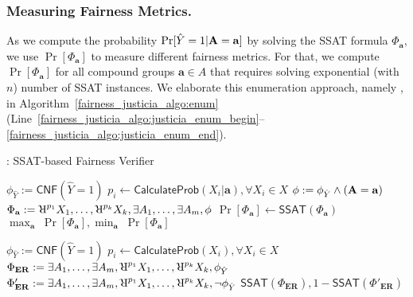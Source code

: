 \subsubsection{Measuring Fairness Metrics.}
As we compute the probability $\Pr[\hat{Y} = 1 | \mathbf{A} = \mathbf{a}]$ by solving the SSAT formula $ \Phi_\mathbf{a} $, we  use $ \Pr[\Phi_\mathbf{a}] $ to measure different fairness metrics. 
For that, we compute $ \Pr[\Phi_\mathbf{a}] $ for all compound groups $\mathbf{a} \in A$ that requires solving exponential (with $n$) number of SSAT instances. 
We elaborate this enumeration approach, namely {\justiciaenum}, in Algorithm~\ref{fairness_justicia_algo:enum}  (Line~\ref{fairness_justicia_algo:justicia_enum_begin}--\ref{fairness_justicia_algo:justicia_enum_end}).

\begin{algorithm}[t!]
	\caption{\justicia: SSAT-based Fairness Verifier}
	\label{fairness_justicia_algo:enum}
	\footnotesize
	\begin{algorithmic}[1]
		\label{fairness_justicia_algo:justicia_enum_begin}
		\State $ \phi_{\hat{Y}} := \mathsf{CNF}(\hat{Y} = 1) $
		\State $ p_{i} \leftarrow \mathsf{CalculateProb}(X_i | \mathbf{a}), \forall X_i \in X $
		\State $ \phi := \phi_{\hat{Y}} \wedge (\mathbf{A} =\mathbf{a}) $
		\State $  \Phi_\mathbf{a} := \R^{p_{1}}X_1, \dots, \R^{p_{\numnonsensitive}}X_{\numnonsensitive}, \exists A_1,\dots, \exists A_{\numsensitive},  \phi $
		\State $ \Pr[\Phi_\mathbf{a}]  \leftarrow \mathsf{SSAT}(\Phi_\mathbf{a}) $ 
		\EndFor
		\State \Return $ \max_{\mathbf{a}} \; \Pr[\Phi_{\mathbf{a}}], \min_{\mathbf{a}} \; \Pr[\Phi_{\mathbf{a}}] $
		\label{fairness_justicia_algo:justicia_enum_end}
		\EndFunction
		
		
		
		\label{fairness_justicia_algo:justicia_learn_begin}
		\State $ \phi_{\hat{Y}} := \mathsf{CNF}(\hat{Y}  = 1) $
		\State $ p_{i} \leftarrow \mathsf{CalculateProb}(X_i), \forall X_i \in X $
		\State $  \Phi_\mathbf{ER} := \exists A_1,\dots, \exists A_{\numsensitive}, \R^{p_{1}}X_1, \dots, \R^{p_{\numnonsensitive}}X_{\numnonsensitive}, \phi_{\hat{Y}} $
		\State $  \Phi'_\mathbf{ER} := \exists A_1,\dots, \exists A_{\numsensitive}, \R^{p_{1}}X_1, \dots, \R^{p_{\numnonsensitive}}X_{\numnonsensitive}, \neg \phi_{\hat{Y}} $
		\State \Return $ \mathsf{SSAT}(\Phi_\mathbf{ER}), 1 - \mathsf{SSAT}(\Phi'_\mathbf{ER}) $
		\label{fairness_justicia_algo:justicia_learn_end}
		\EndFunction
	\end{algorithmic}

\end{algorithm}


